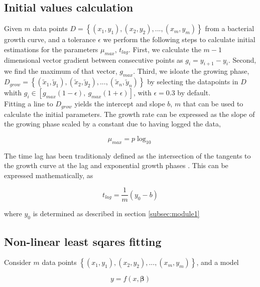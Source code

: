 \documentclass[titlepage,11pt]{article}
\begin{document}
\begin{linenumbers}
			\subsection{Initial values calculation}\label{subsec:initial_values}
			Given $ m $ data points $ D =  \left\{(x_1, y_1), (x_2, y_2), ... , (x_m, y_m)\right\} $ from a bacterial growth curve, and a tolerance $ \epsilon $ we perform the following steps to calculate initial estimations for the parameters $ \mu_{max} $, $ t_{lag} $. First, we calculate the $ m - 1 $ dimensional vector gradient between consecutive points as $ g_i = y_{i+1} - y_i $. Second, we find the maximum of that vector, $ g_{max} $. Third, we isloate the growing phase, $ D_{grow} = \left\{(\tilde{x}_1, \tilde{y}_1), (\tilde{x}_2, \tilde{y}_2), ... , (\tilde{x}_n, \tilde{y}_n)\right\} $ by selecting the datapoints in $ D $ whith $g_i \in [g_{max}(1-\epsilon), \ g_{max}(1+\epsilon)]$, with $ \epsilon = 0.3 $ by default.\\
			Fitting a line to $ D_{grow} $ yields the intercept and slope $ b $, $ m $ that can be used to calculate the initial parameters. The growth rate can be expressed as the slope of the growing phase scaled by a constant due to having logged the data, 
			\begin{linenomath*}
				\begin{equation}
				\mu_{max}  = p\log_{10}
				\end{equation}
			\end{linenomath*}
			
			The time lag has been traditionaly defined as the intersection of the tangents to the growth curve at the lag and exponential growth phases \cite{Micha2011}. This can be expressed mathematically, as 
			\begin{linenomath*}
				\begin{equation}
				t_{lag} = \frac{1}{m}(y_0 - b)
				\end{equation}
			\end{linenomath*}
			
			where $ y_0  $ is determined as described in section \ref{subsec:module1}
			\subsection{Non-linear least sqares fitting}\label{subsec:non-linear least squares fitting}
			Consider $ m $ data points $ \left\{(x_1, y_1), (x_2, y_2), ... , (x_m, y_m)\right\} $, and a model
			\begin{linenomath*}
				\begin{equation}
				y = f(x, \boldsymbol{\beta})
				\end{equation}
			\end{linenomath*}
			

\end{linenumbers}
\end{document}
